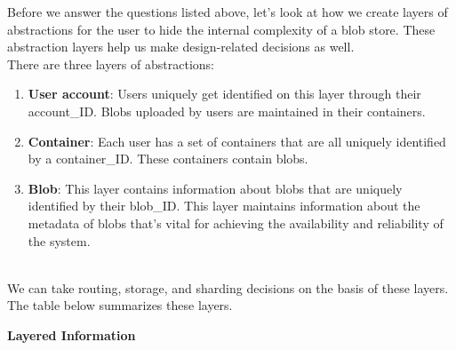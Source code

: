 Before we answer the questions listed above, let's look at how we create layers of abstractions for the user to hide the internal complexity of a blob store. These abstraction layers help us make design-related decisions as well.
\\
There are three layers of abstractions:

\begin{enumerate}
\item
\protect{}\label{OZ4pY7JfkYCanG9iuVw7c}
\textbf{User account}: Users uniquely get identified on this layer through their account\_ID. Blobs uploaded by users are maintained in their containers.
\item
\protect{}\label{il1Ajs5eAFXDtaxqV_-lE}
\textbf{Container}: Each user has a set of containers that are all uniquely identified by a container\_ID. These containers contain blobs.
\item
\protect{}\label{nPM_TKB1bt0IYwQDzUYKR}
\textbf{Blob}: This layer contains information about blobs that are uniquely identified by their blob\_ID. This layer maintains information about the metadata of blobs that's vital for achieving the availability and reliability of the system.
\end{enumerate}
\\
We can take routing, storage, and sharding decisions on the basis of these layers. The table below summarizes these layers.

\textbf{Layered Information}

\begin{table}[htbp]
\centering
\small
{}
\caption{Layered Information}
\end{table}

